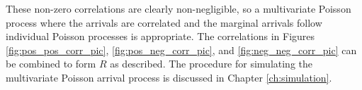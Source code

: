 These non-zero correlations are clearly non-negligible, so a multivariate Poisson process where the arrivals are correlated and the marginal arrivals follow individual Poisson processes is appropriate. The correlations in Figures \ref{fig:pos_pos_corr_pic}, \ref{fig:pos_neg_corr_pic}, and \ref{fig:neg_neg_corr_pic} can be combined to form $R$ as described. The procedure for simulating the multivariate Poisson arrival process is discussed in Chapter \ref{ch:simulation}.
